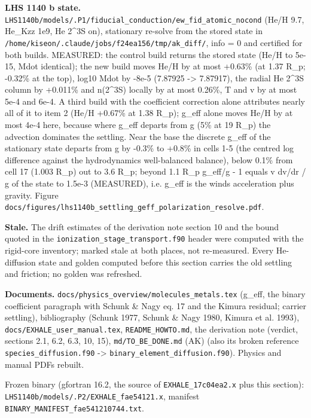 \documentclass[english,a4paper]{my_memo}
\begin{document}
\textbf{LHS 1140 b state.} \texttt{LHS1140b/models/.P1/fiducial\_conduction/ew\_fid\_atomic\_nocond}
(He/H 9.7, He\_Kzz 1e9, He 2\^{}3S on), stationary re-solve from the stored
state in \texttt{/home/kiseon/.claude/jobs/f24ea156/tmp/ak\_diff/}, info = 0 and
certified for both builds. MEASURED: the control build returns the stored
state (He/H to 5e-15, Mdot identical); the new build moves He/H by at most
+0.63\% (at 1.37 R\_p; -0.32\% at the top), log10 Mdot by -8e-5 (7.87925 -\textgreater{}
7.87917), the radial He 2\^{}3S column by +0.011\% and n(2\^{}3S) locally by at most
0.26\%, T and v by at most 5e-4 and 6e-4. A third build with the coefficient
correction alone attributes nearly all of it to item 2 (He/H +0.67\% at
1.38 R\_p); g\_eff alone moves He/H by at most 4e-4 here, because where g\_eff
departs from g (5\% at 19 R\_p) the advection dominates the settling. Near the
base the discrete g\_eff of the stationary state departs from g by -0.3\% to
+0.8\% in cells 1-5 (the centred log difference against the hydrodynamics\textquotesingle{}
well-balanced balance), below 0.1\% from cell 17 (1.003 R\_p) out to 3.6 R\_p;
beyond 1.1 R\_p g\_eff/g - 1 equals v dv/dr / g of the state to 1.5e-3
(MEASURED), i.e. g\_eff is the wind\textquotesingle s acceleration plus gravity. Figure
\texttt{docs/figures/lhs1140b\_settling\_geff\_polarization\_resolve.pdf}.

\textbf{Stale.} The drift estimates of the derivation note section 10 and the
bound quoted in the \texttt{ionization\_stage\_transport.f90} header were computed
with the rigid-core inventory; marked stale at both places, not re-measured.
Every He-diffusion state and golden computed before this section carries the
old settling and friction; no golden was refreshed.

\textbf{Documents.} \texttt{docs/physics\_overview/molecules\_metals.tex} (g\_eff, the
binary coefficient paragraph with Schunk \& Nagy eq. 17 and the Kimura
residual; carrier settling), bibliography (Schunk 1977, Schunk \& Nagy 1980,
Kimura et al. 1993), \texttt{docs/EXHALE\_user\_manual.tex}, \texttt{README\_HOWTO.md}, the
derivation note (verdict, sections 2.1, 6.2, 6.3, 10, 15), \texttt{md/TO\_BE\_DONE.md}
(AK) (also its broken reference \texttt{species\_diffusion.f90} -\textgreater{}
\texttt{binary\_element\_diffusion.f90}). Physics and manual PDFs rebuilt.

Frozen binary (gfortran 16.2, the source of \texttt{EXHALE\_17c04ea2.x} plus this
section): \texttt{LHS1140b/models/.P2/EXHALE\_fae54121.x}, manifest
\texttt{BINARY\_MANIFEST\_fae541210744.txt}.
\end{document}

